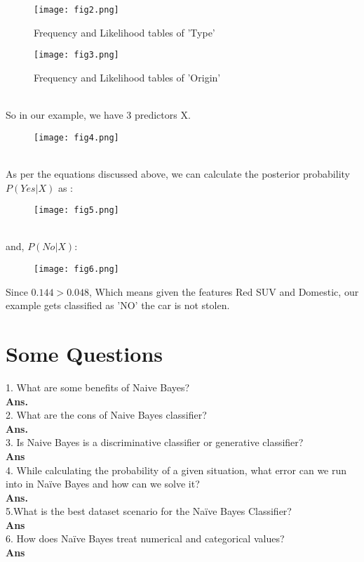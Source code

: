 \documentclass[a4paper, 11pt]{article}
\begin{document}
  \begin{figure}[ht!]
    \texttt{[image: fig2.png]}
    \caption{Frequency and Likelihood tables of 'Type'}
    \label{fig:fig2}
  \end{figure}
  \begin{figure}[ht!]
    \texttt{[image: fig3.png]}
    \caption{Frequency and Likelihood tables of 'Origin'}
    \label{fig:fig3}
  \end{figure}
  \\ So in our example, we have 3 predictors X.
  \begin{figure}[ht!]
    \texttt{[image: fig4.png]}
    \label{fig:fig4}
  \end{figure}
  \\As per the equations discussed above, we can calculate the posterior probability $P(Yes | X)$ as :
  \begin{figure}[ht!]
    \texttt{[image: fig5.png]}
    \label{fig:fig5}
  \end{figure}
  \\ and, $ P(No|X)$:
  \begin{figure}[ht!]
    \texttt{[image: fig6.png]}
    \label{fig:fig6}
  \end{figure}

  Since $0.144 > 0.048$, Which means given the features Red SUV and Domestic, our example gets classified as ’NO’ the car is not stolen.



\section{Some Questions}
1. What are some benefits of Naive Bayes?\\
\textbf{Ans.} \\
2. What are the cons of Naive Bayes classifier? \\
\textbf{Ans.} \\
3. Is Naive Bayes is a discriminative classifier or generative classifier? \\ 
\textbf{Ans} \\
4. While calculating the probability of a given situation, what error can we run into in Naïve Bayes and how can we solve it? \\
\textbf{Ans.}  \\         
5.What is the best dataset scenario for the Naïve Bayes Classifier?\\
\textbf{Ans} \\
6. How does Naïve Bayes treat numerical and categorical values? \\
\textbf{Ans} \\

\end{document}
